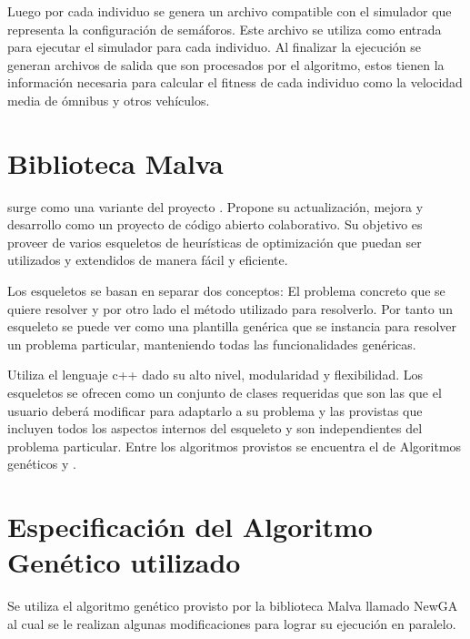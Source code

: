 Luego por cada individuo se genera un archivo compatible con el simulador que representa la configuración de semáforos. Este archivo se utiliza como entrada para ejecutar el simulador para cada individuo. Al finalizar la ejecución se generan archivos de salida que son procesados por el algoritmo, estos tienen la información necesaria para calcular el fitness de cada individuo como la velocidad media de ómnibus y otros vehículos.


\section{Biblioteca Malva}

\citet{Malva} surge como una variante del proyecto \citet{Mallba}. Propone su actualización, mejora y desarrollo como un proyecto de código abierto colaborativo.  Su objetivo es proveer de varios esqueletos de  heurísticas de optimización que puedan ser utilizados y extendidos de manera fácil y eficiente.

Los esqueletos se basan en separar dos conceptos: El problema concreto que se quiere resolver y por otro lado el método utilizado para resolverlo. Por tanto un esqueleto se puede ver como una plantilla genérica que se instancia para resolver un problema particular, manteniendo todas las funcionalidades genéricas.

Utiliza el lenguaje c++ dado su alto nivel, modularidad y flexibilidad. Los esqueletos se ofrecen como un conjunto de clases requeridas que son las que el usuario deberá modificar para adaptarlo a su problema y las provistas que incluyen todos los aspectos internos del esqueleto y son independientes del problema particular. Entre los algoritmos provistos se encuentra el de Algoritmos genéticos y \citet{CHC}.



\newpage

\section{Especificación del Algoritmo Genético utilizado}
Se utiliza el algoritmo genético provisto por la biblioteca  Malva  llamado NewGA al cual se le realizan algunas modificaciones para lograr su ejecución en paralelo.


